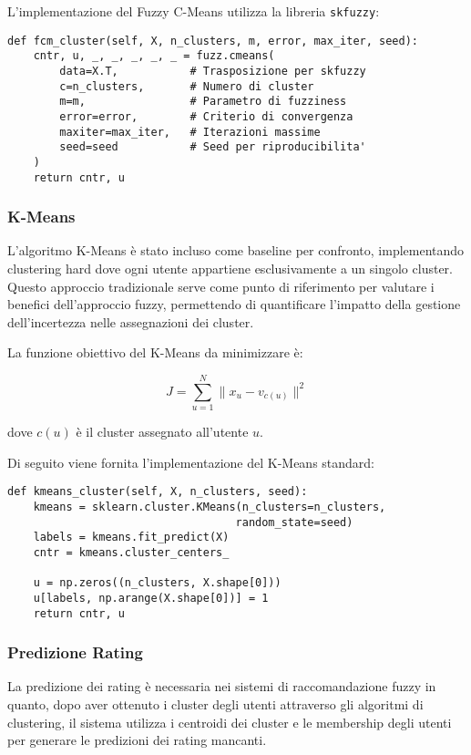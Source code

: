 L'implementazione del Fuzzy C-Means utilizza la libreria \texttt{skfuzzy}:

\begin{lstlisting}[style=PythonStyle, caption=Implementazione FCM]
def fcm_cluster(self, X, n_clusters, m, error, max_iter, seed):
    cntr, u, _, _, _, _, _ = fuzz.cmeans(
        data=X.T,           # Trasposizione per skfuzzy
        c=n_clusters,       # Numero di cluster
        m=m,                # Parametro di fuzziness
        error=error,        # Criterio di convergenza
        maxiter=max_iter,   # Iterazioni massime
        seed=seed           # Seed per riproducibilita'
    )
    return cntr, u
\end{lstlisting}

\subsubsection{K-Means}
L'algoritmo K-Means è stato incluso come baseline per confronto, implementando clustering hard dove ogni utente appartiene esclusivamente a un singolo cluster. Questo approccio tradizionale serve come punto di riferimento per valutare i benefici dell'approccio fuzzy, permettendo di quantificare l'impatto della gestione dell'incertezza nelle assegnazioni dei cluster.

La funzione obiettivo del K-Means da minimizzare è:

\[
J = \sum_{u=1}^{N} \lVert x_u - v_{c(u)} \rVert^2
\]

dove $c(u)$ è il cluster assegnato all’utente $u$.

Di seguito viene fornita l'implementazione del K-Means standard:

\begin{lstlisting}[style=PythonStyle, caption=Implementazione K-Means]
def kmeans_cluster(self, X, n_clusters, seed):
    kmeans = sklearn.cluster.KMeans(n_clusters=n_clusters, 
                                   random_state=seed)
    labels = kmeans.fit_predict(X)
    cntr = kmeans.cluster_centers_
    
    u = np.zeros((n_clusters, X.shape[0]))
    u[labels, np.arange(X.shape[0])] = 1
    return cntr, u
\end{lstlisting}

\subsubsection{Predizione Rating}
La predizione dei rating è necessaria nei sistemi di raccomandazione fuzzy in quanto, dopo aver ottenuto i cluster degli utenti attraverso gli algoritmi di clustering, il sistema utilizza i centroidi dei cluster e le membership degli utenti per generare le predizioni dei rating mancanti.

